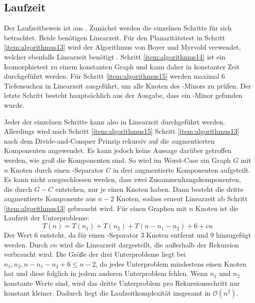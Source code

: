 \subsection{Laufzeit}
Der Laufzeitbeweis ist aus \cite{KeM92}.
Zunächst werden die einzelnen Schritte für sich betrachtet.
Beide benötigen Linearzeit\cite{HoT73}\cite{GuM00}.
Für den Planaritätstest in Schritt \ref{item:algorithmus13} wird der Algorithmus von Boyer und Myrvold verwendet, welcher ebenfalls Linearzeit benötigt \cite{BoM04}.
Schritt \ref{item:algorithmus14} ist ein Isomorphietest zu einem konstanten Graph und kann daher in konstanter Zeit durchgeführt werden.
Für Schritt \ref{item:algorithmus15} werden maximal 6 Tiefensuchen in Linearzeit ausgeführt, um alle Knoten des \kdd-Minors zu prüfen.
Der letzte Schritt besteht hauptsächlich aus der Ausgabe, dass ein \kf-Minor gefunden wurde.

Jeder der einzelnen Schritte kann also in Linearzeit durchgeführt werden.
Allerdings wird nach Schritt \ref{item:algorithmus15} \ggf Schritt \ref{item:algorithmus13} nach dem Divide-and-Conquer Prinzip rekursiv auf die augmentierten Komponenten angewendet.
Es kann jedoch keine Aussage darüber getroffen werden, wie groß die Komponenten sind.
So wird im Worst-Case ein Graph $G$ mit $n$ Knoten durch einen \dd-Separator $C$ in drei augmentierte Komponenten aufgeteilt.
Es kann nicht ausgeschlossen werden, dass zwei Zusammenhangskomponenten, die durch $G - C$ entstehen, nur je einen Knoten haben.
Dann besteht die dritte augmentierte Komponente aus $n-2$ Knoten, sodass erneut Linearzeit ab Schritt \ref{item:algorithmus13} gebraucht wird.
Für einen Graphen mit $n$ Knoten ist die Laufzeit der Unterprobleme:
\begin{equation*}
  T(n) = T(n_1) + T(n_2) + T(n - n_1 - n_2) + 6 + cn
\end{equation*}
Der Wert $6$ entsteht, da für einen \dd-Separator $3$ Knoten entfernt und $9$ hinzugefügt werden.
Durch $cn$ wird die Linearzeit dargestellt, die außerhalb der Rekursion verbraucht wird.
Die Größe der drei Unterprobleme liegt bei $n_1, n_2, n - n_1 - n_2 + 6 \leq n - 2$, da jedes Unterproblem mindestens einen Knoten hat und diese folglich in jedem anderen Unterproblem fehlen.
Wenn $n_1$ und $n_2$ konstante Werte sind, wird das dritte Unterproblem pro Rekursionsschritt nur konstant kleiner.
Dadurch liegt die Laufzeitkomplexität insgesamt in $\mathcal{O}(n^2)$\cite{KeM92}.
